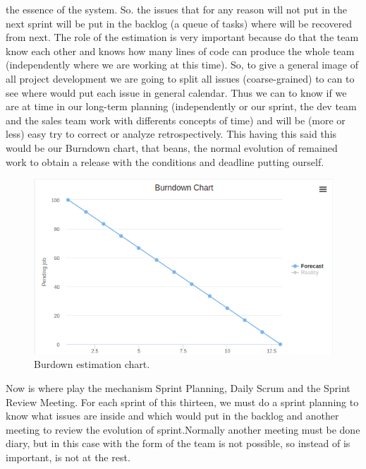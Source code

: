 the essence of the system.
So. the issues that for any reason will not put in the next sprint will be put
in the backlog (a queue of tasks) where will be recovered from next.
The role of the estimation is very important because do that the team know each
other and knows how many lines of code can produce the whole team (independently
where we are working at this time).
\intro
So, to give a general image of all project development we are going to split all
issues (coarse-grained) to can to see where would put each issue in general calendar.
Thus we can to know if we are at time in our long-term planning (independently or
our sprint, the dev team and the sales team work with differents concepts of time)
and will be (more or less) easy try to correct or analyze retrospectively.
\intro
This having this said this would be our Burndown chart, that beans, the normal
evolution of remained work to obtain a release with the conditions and deadline
putting ourself.

\begin{figure}[H]
  \includegraphics[scale=0.4]{img/graphics/burndown.png}
  \centering
  \caption{Burdown estimation chart.}
\end{figure}

\noindent Now is where play the mechanism Sprint Planning, Daily Scrum and the Sprint
Review Meeting. For each sprint of this thirteen, we must do a sprint planning
to know what issues are inside and which would put in the backlog and another
meeting to review the evolution of sprint.Normally another meeting must be done
diary, but in this case with the form of the team is not possible, so instead of is important, is not at the rest.
